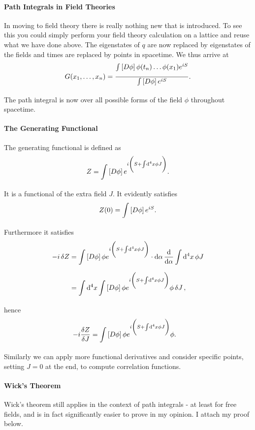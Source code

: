 \paragraph{Path Integrals in Field Theories}
In moving to field theory there is really nothing new that is introduced. To see this you could simply perform your field theory calculation on a lattice and reuse what we have done above. The eigenstates of $q$ are now replaced by eigenstates of the fields and times are replaced by points in spacetime. We thus arrive at
\begin{align*}
	G(x_{1}, \dots, x_{n}) = \frac{\int\limits_{}\left[D\phi\right]\phi(t_{n})\dots \phi(x_{1})e^{iS}}{\int\limits_{}\left[D\phi\right]e^{iS}}.
\end{align*}
The path integral is now over all possible forms of the field $\phi$ throughout spacetime.

\paragraph{The Generating Functional}
The generating functional is defined as
\begin{align*}
	Z = \int\limits_{}\left[D\phi\right]e^{i\left(S + \int\limits_{}^{}\dd[4]{x}\phi J\right)}.
\end{align*}
It is a functional of the extra field $J$. It evidently satisfies
\begin{align*}
	Z(0) = \int\limits_{}\left[D\phi\right]e^{iS}.
\end{align*}
Furthermore it satisfies
\begin{align*}
	-i\var{Z} &= \int\limits_{}\left[D\phi\right]\phi e^{i\left(S + \int\limits_{}^{}\dd[4]{x}\phi J\right)}\cdot\dd{\alpha}\dv{\alpha}\int\limits_{}^{}\dd[4]{x}\phi J \\
	          &= \int\limits_{}^{}\dd[4]{x}\int\limits_{}\left[D\phi\right]\phi e^{i\left(S + \int\limits_{}^{}\dd[4]{x}\phi J\right)}\phi\var{J},
\end{align*}
hence
\begin{align*}
	-i\fdv{Z}{J} &= \pinte{}{\phi}\phi e^{i\left(S + \inte{}{}\dd[4]{x}\phi J\right)}\phi.
\end{align*}
Similarly we can apply more functional derivatives and consider specific points, setting $J = 0$ at the end, to compute correlation functions.

\paragraph{Wick's Theorem}
Wick's theorem still applies in the context of path integrals - at least for free fields, and is in fact significantly easier to prove in my opinion. I attach my proof below.

